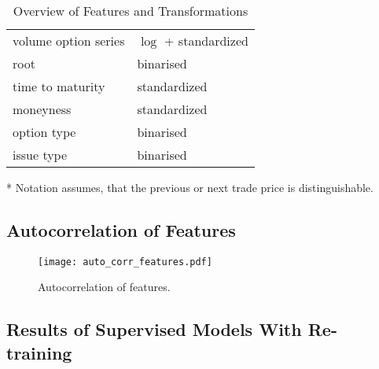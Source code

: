 \begin{table}[H]
\begin{threeparttable}
\begin{tabular}{@{}ll@{}}
            volume option series    & $\log$ + standardized  \\
            root                    & binarised              \\
            time to maturity        & standardized           \\
            moneyness               & standardized           \\
            option type             & binarised              \\
            issue type              & binarised              \\ \bottomrule
        \end{tabular}
        \begin{tablenotes}\footnotesize
            \item[*] Notation assumes, that the previous or next trade price is distinguishable.
        \end{tablenotes}
    \end{threeparttable}
    \caption[Overview of Features and Transformations]{Overview of Features and Transformations}
    \label{tab:features-transformations}
\end{table}

\newpage
\subsection{Autocorrelation of Features}
\label{app:autocorrelation-of-features}

\begin{figure}[ht]
    \centering
    \texttt{[image: auto\_corr\_features.pdf]}
    \caption[Autocorrelation of Features]{Autocorrelation of features.}
    \label{fig:auto-correlation-features}
\end{figure}

\newpage
\subsection{Results of Supervised Models With Re-training}
\label{app:results-of-supervised-models-with-re-training}


